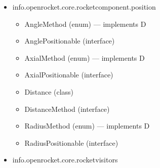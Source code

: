 \documentclass{amsdtx}
\begin{document}
\begin{itemize}
\begin{itemize}
\begin{itemize}
      must (class)
    \item
      need (class)
    \item
      provides (class)
    \item
      replaces (class)
    \item
      representing (class)
    \item
      represents (class)
    \item
      represents (class)
    \item
      should (class)
    \item
      that (class)
    \item
      to (class)
    \item
      type (class)
    \item
      type (class)
    \item
      type (class)
    \item
      type (class)
    \item
      type (class)
    \item
      type (class)
    \item
      type (class)
    \item
      used (class)
    \item
      uses (class)
    \item
      which (interface)
    \end{itemize}
  \item
    info.openrocket.core.rocketcomponent.position

    \begin{itemize}
    
    \item
      AngleMethod (enum) --- implements D
    \item
      AnglePositionable (interface)
    \item
      AxialMethod (enum) --- implements D
    \item
      AxialPositionable (interface)
    \item
      Distance (class)
    \item
      DistanceMethod (interface)
    \item
      RadiusMethod (enum) --- implements D
    \item
      RadiusPositionable (interface)
    \end{itemize}
  \item
    info.openrocket.core.rocketvisitors

    \begin{itemize}
    

\end{itemize}
\end{itemize}
\end{itemize}
\end{document}
